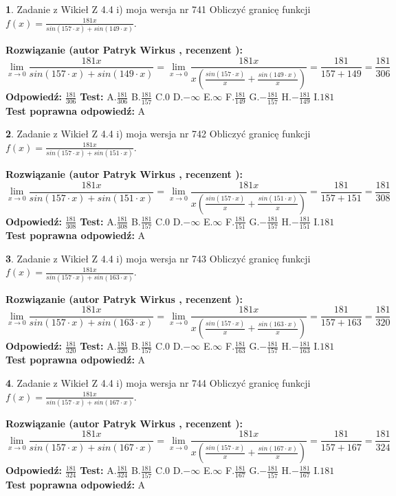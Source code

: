 \documentclass[12pt, a4paper]{article}
\theoremstyle{definition} %
\newtheorem{zad}{}
\newcommand{\zadStart}[1]{\begin{zad}#1\newline}
\newcommand{\zadStop}{\end{zad}}
\newcommand{\rozwStart}[2]{\noindent \textbf{Rozwiązanie (autor #1 , recenzent #2): }\newline}
\newcommand{\rozwStop}{\newline}
\newcommand{\odpStart}{\noindent \textbf{Odpowiedź:}\newline}
\newcommand{\odpStop}{\newline}
\newcommand{\testStart}{\noindent \textbf{Test:}\newline}
\newcommand{\testStop}{\newline}
\newcommand{\kluczStart}{\noindent \textbf{Test poprawna odpowiedź:}\newline}
\newcommand{\kluczStop}{\newline}
\begin{document}
\zadStart{Zadanie z Wikieł Z 4.4 i) moja wersja nr 741}
Obliczyć granicę funkcji $f(x)=\frac{181x}{sin(157\cdot x) +sin(149\cdot x)}$.
\zadStop
\rozwStart{Patryk Wirkus}{}
$$\lim\limits_{x\to 0}\frac{181x}{sin(157\cdot x) +sin(149\cdot x)}=\lim\limits_{x\to 0}\frac{181x}{x(\frac{sin(157\cdot x)}{x}+\frac{sin(149\cdot x)}{x})}=\frac{181}{157+149} = \frac{181}{306}$$
\rozwStop
\odpStart
$\frac{181}{306}$
\odpStop
\testStart
A.$\frac{181}{306}$
B.$\frac{181}{157}$
C.$0$
D.$-\infty$
E.$\infty$
F.$\frac{181}{149}$
G.$-\frac{181}{157}$
H.$-\frac{181}{149}$
I.$181$
\testStop
\kluczStart
A
\kluczStop



\zadStart{Zadanie z Wikieł Z 4.4 i) moja wersja nr 742}
Obliczyć granicę funkcji $f(x)=\frac{181x}{sin(157\cdot x) +sin(151\cdot x)}$.
\zadStop
\rozwStart{Patryk Wirkus}{}
$$\lim\limits_{x\to 0}\frac{181x}{sin(157\cdot x) +sin(151\cdot x)}=\lim\limits_{x\to 0}\frac{181x}{x(\frac{sin(157\cdot x)}{x}+\frac{sin(151\cdot x)}{x})}=\frac{181}{157+151} = \frac{181}{308}$$
\rozwStop
\odpStart
$\frac{181}{308}$
\odpStop
\testStart
A.$\frac{181}{308}$
B.$\frac{181}{157}$
C.$0$
D.$-\infty$
E.$\infty$
F.$\frac{181}{151}$
G.$-\frac{181}{157}$
H.$-\frac{181}{151}$
I.$181$
\testStop
\kluczStart
A
\kluczStop



\zadStart{Zadanie z Wikieł Z 4.4 i) moja wersja nr 743}
Obliczyć granicę funkcji $f(x)=\frac{181x}{sin(157\cdot x) +sin(163\cdot x)}$.
\zadStop
\rozwStart{Patryk Wirkus}{}
$$\lim\limits_{x\to 0}\frac{181x}{sin(157\cdot x) +sin(163\cdot x)}=\lim\limits_{x\to 0}\frac{181x}{x(\frac{sin(157\cdot x)}{x}+\frac{sin(163\cdot x)}{x})}=\frac{181}{157+163} = \frac{181}{320}$$
\rozwStop
\odpStart
$\frac{181}{320}$
\odpStop
\testStart
A.$\frac{181}{320}$
B.$\frac{181}{157}$
C.$0$
D.$-\infty$
E.$\infty$
F.$\frac{181}{163}$
G.$-\frac{181}{157}$
H.$-\frac{181}{163}$
I.$181$
\testStop
\kluczStart
A
\kluczStop



\zadStart{Zadanie z Wikieł Z 4.4 i) moja wersja nr 744}
Obliczyć granicę funkcji $f(x)=\frac{181x}{sin(157\cdot x) +sin(167\cdot x)}$.
\zadStop
\rozwStart{Patryk Wirkus}{}
$$\lim\limits_{x\to 0}\frac{181x}{sin(157\cdot x) +sin(167\cdot x)}=\lim\limits_{x\to 0}\frac{181x}{x(\frac{sin(157\cdot x)}{x}+\frac{sin(167\cdot x)}{x})}=\frac{181}{157+167} = \frac{181}{324}$$
\rozwStop
\odpStart
$\frac{181}{324}$
\odpStop
\testStart
A.$\frac{181}{324}$
B.$\frac{181}{157}$
C.$0$
D.$-\infty$
E.$\infty$
F.$\frac{181}{167}$
G.$-\frac{181}{157}$
H.$-\frac{181}{167}$
I.$181$
\testStop
\kluczStart
A
\kluczStop
\end{document}
